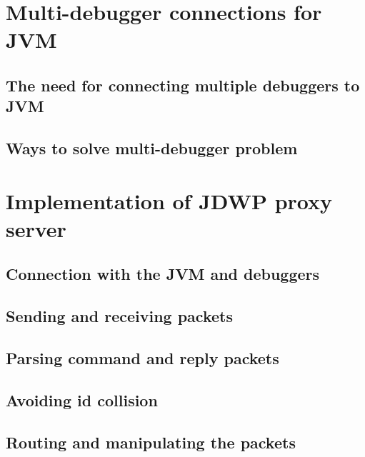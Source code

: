\documentclass{style/bachelor-thesis}
\begin{document}
\pagebreak

\section{Multi-debugger connections for JVM}
\label{sec:proxy}


\subsection{The need for connecting multiple debuggers to JVM}
\label{sec:need_for_proxy}


\subsection{Ways to solve multi-debugger problem}
\label{sec:proxy_solutions}


\pagebreak

\section{Implementation of JDWP proxy server}
\label{sec:implementation}


\subsection{Connection with the JVM and debuggers}
\label{sec:impl_connection}


\subsection{Sending and receiving packets}
\label{sec:impl_io}


\subsection{Parsing command and reply packets}
\label{sec:impl_parsing}


\subsection{Avoiding id collision}
\label{sec:impl_id}


\subsection{Routing and manipulating the packets}
\label{sec:impl_routing}

\end{document}
